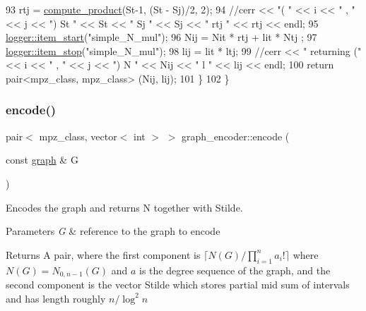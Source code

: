 \begin{DoxyCode}
93     rtj = \hyperlink{compression__helper_8cpp_ae2afb43aabe50f7d42aae8f82b5a35f4}{compute\_product}(St-1, (St - Sj)/2, 2);
94     \textcolor{comment}{//cerr << "( " << i << " , " << j << ") St " << St << " Sj " << Sj << " rtj " << rtj << endl;}
95     \hyperlink{classlogger_a7e21ec6ad2d40cfc2c6a383521b5641a}{logger::item\_start}(\textcolor{stringliteral}{"simple\_N\_mul"});
96     Nij = Nit * rtj + lit * Ntj ;
97     \hyperlink{classlogger_a6775fee9681c437fc9c05d71cfbbe4a2}{logger::item\_stop}(\textcolor{stringliteral}{"simple\_N\_mul"});
98     lij = lit * ltj;
99     \textcolor{comment}{//cerr << " returning (" << i << " , " << j << ") N " << Nij << " l " << lij << endl;}
100     \textcolor{keywordflow}{return} pair<mpz\_class, mpz\_class> (Nij, lij);
101   \}
102 \}
\end{DoxyCode}
\mbox{\label{classgraph__encoder_a23350e4c0986763b24d14c5ef1beb37e}} 
\subsubsection{\texorpdfstring{encode()}{encode()}}
{\footnotesize\ttfamily pair$<$ mpz\+\_\+class, vector$<$ int $>$ $>$ graph\+\_\+encoder\+::encode (\begin{DoxyParamCaption}\item[{const \hyperlink{classgraph}{graph} \&}]{G }\end{DoxyParamCaption})}



Encodes the graph and returns N together with Stilde. 


\begin{DoxyParams}{Parameters}
{\em G} & reference to the graph to encode \\
\hline
\end{DoxyParams}
\begin{DoxyReturn}{Returns}
A pair, where the first component is $\lceil N(G) / \prod_{i=1}^n a_i! \rceil$ where $N(G) = N_{0,n-1}(G)$ and $a$ is the degree sequence of the graph, and the second component is the vector Stilde which stores partial mid sum of intervals and has length roughly $n / \log^2 n$ 
\end{DoxyReturn}

